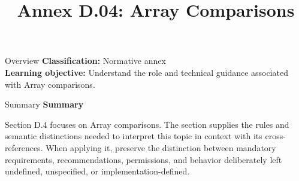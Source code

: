 \documentclass[10pt,letterpaper]{article}
\title{Annex D.04: Array Comparisons}
\author{}
\date{}
\begin{document}
\maketitle
\begin{CornellOverviewBox}{Overview}
\textbf{Classification:} Normative annex\\[2pt]
\textbf{Learning objective:} Understand the role and technical guidance associated with Array comparisons.
\end{CornellOverviewBox}\begin{CornellSummaryBox}{Summary}
{\sffamily\bfseries\color{Accent} Summary}\par\vspace{3pt}Section D.4 focuses on Array comparisons. The section supplies the rules and semantic distinctions needed to interpret this topic in context with its cross-references. When applying it, preserve the distinction between mandatory requirements, recommendations, permissions, and behavior deliberately left undefined, unspecified, or implementation-defined.
\end{CornellSummaryBox}
\end{document}
